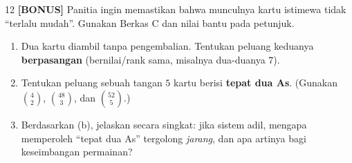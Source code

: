 \documentclass[11pt]{article}
\newenvironment{subsoal}{%
  \begin{enumerate}[label=\textbf{(\alph*)},leftmargin=1.8em,itemsep=5pt,topsep=3pt]}%
  {\end{enumerate}}
\begin{document}
\begin{soal}{12 \normalfont\bfseries[BONUS]}
Panitia ingin memastikan bahwa munculnya kartu istimewa tidak ``terlalu mudah''.
Gunakan Berkas C dan nilai bantu pada petunjuk.
\begin{subsoal}
  \item Dua kartu diambil tanpa pengembalian. Tentukan peluang keduanya
        \textbf{berpasangan} (bernilai/rank sama, misalnya dua-duanya $7$).
  \item Tentukan peluang sebuah tangan $5$ kartu berisi \textbf{tepat dua As}.
        (Gunakan $\binom{4}{2}$, $\binom{48}{3}$, dan $\binom{52}{5}$.)
  \item Berdasarkan (b), jelaskan secara singkat: jika sistem adil, mengapa
        memperoleh ``tepat dua As'' tergolong \emph{jarang}, dan apa artinya bagi
        keseimbangan permainan?
\end{subsoal}
\end{soal}
\end{document}
